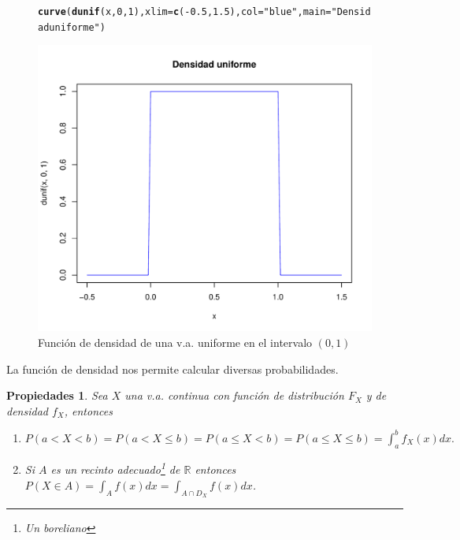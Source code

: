 \documentclass[handout]{beamer}\usepackage[]{graphicx}\usepackage[]{color}
\makeatletter
\def\maxwidth{ %
  \ifdim\Gin@nat@width>\linewidth
    \linewidth
  \else
    \Gin@nat@width
  \fi
}
\newcommand{\hlnum}[1]{\textcolor[rgb]{0.686,0.059,0.569}{#1}}%
\newcommand{\hlstr}[1]{\textcolor[rgb]{0.192,0.494,0.8}{#1}}%
\newcommand{\hlopt}[1]{\textcolor[rgb]{0,0,0}{#1}}%
\newcommand{\hlstd}[1]{\textcolor[rgb]{0.345,0.345,0.345}{#1}}%
\newcommand{\hlkwc}[1]{\textcolor[rgb]{0.333,0.667,0.333}{#1}}%
\newcommand{\hlkwd}[1]{\textcolor[rgb]{0.737,0.353,0.396}{\textbf{#1}}}%
\newenvironment{kframe}{%
 \def\at@end@of@kframe{}%
 \ifinner\ifhmode%
  \def\at@end@of@kframe{\end{minipage}}%
  \begin{minipage}{\columnwidth}%
 \fi\fi%
 \def\FrameCommand##1{\hskip\@totalleftmargin \hskip-\fboxsep
 \colorbox{shadecolor}{##1}\hskip-\fboxsep
     \hskip-\linewidth \hskip-\@totalleftmargin \hskip\columnwidth}%
 \MakeFramed {\advance\hsize-\width
   \@totalleftmargin\z@ \linewidth\hsize
   \@setminipage}}%
 {\par\unskip\endMakeFramed%
 \at@end@of@kframe}
\newenvironment{knitrout}{}{} %
\newcommand{\RR}{\mathbb{R}}
\renewcommand{\leq}{\leqslant}
\theoremstyle{plain}
\newtheorem{prop}{Propiedades}
\theoremstyle{definition}
\makeatother
\begin{document}
\begin{frame}[fragile]

\begin{figure}
\begin{center}
\begin{knitrout}
\color{fgcolor}\begin{kframe}
\begin{alltt}
\hlkwd{curve}\hlstd{(}\hlkwd{dunif}\hlstd{(x,}\hlnum{0}\hlstd{,}\hlnum{1}\hlstd{),}\hlkwc{xlim}\hlstd{=}\hlkwd{c}\hlstd{(}\hlopt{-}\hlnum{0.5}\hlstd{,}\hlnum{1.5}\hlstd{),}\hlkwc{col}\hlstd{=}\hlstr{"blue"}\hlstd{,}\hlkwc{main}\hlstd{=}\hlstr{"Densidad uniforme"}\hlstd{)}
\end{alltt}
\end{kframe}
\includegraphics[width=\maxwidth]{figure/unnamed-chunk-2-1} 

\end{knitrout}
\end{center}
\caption{Función de densidad de una v.a. uniforme en el intervalo
$(0,1)$}
\end{figure}

\end{frame}

\begin{frame}
La función de densidad nos permite calcular diversas probabilidades.

\begin{prop} Sea $X$ una v.a. continua con función de distribución $F_X$ y de
densidad $f_X$, entonces
\begin{enumerate}
\item $P(a< X< b)=P(a<X\leq b)= P(a\leq X< b)= P(a\leq X\leq b)=\int_{a}^b f_X(x) dx.$
\item Si $A$ es un recinto adecuado\footnote{ Un boreliano} de $\RR$ entonces $P(X\in
A)=\int_{A} f(x) dx=\int_{A\cap D_X} f(x) dx$.
\end{enumerate}
\end{prop}

\end{frame}
\end{document}
